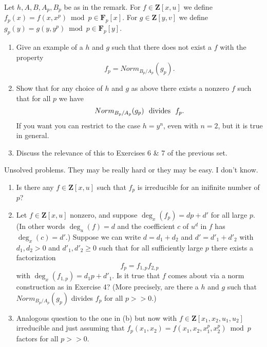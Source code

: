 \begin{exercise}
Let $h,A,B,A_p,B_p$ be as in the remark. For $f \in {\mathbf Z}[x,u]$ we
define $f_p(x) = f(x,x^p) \bmod p \in {\mathbf F}_p[x]$. For
$g \in {\mathbf Z}[y,v]$ we define
$g_p(y) = g(y,y^p) \bmod p \in {\mathbf F}_p[y]$. 
\begin{enumerate}
\item Give an example of a $h$ and $g$ such that 
there does not exist a $f$ with the property
$$
f_p  =  Norm_{B_p/A_p}(g_p).
$$
\item Show that for any choice of $h$ and $g$ as above
there exists a nonzero $f$ such that for all $p$ we have 
$$
Norm_{B_p/A_p}(g_p)\ \ \hbox{divides}\ \ f_p .
$$
If you want you can restrict to the case $h=y^n$, even with $n=2$,
but it is true in general.
\item Discuss the relevance of this to Exercises 6 \& 7 of the previous
set.
\end{enumerate}
\end{exercise}

\begin{exercise}
Unsolved problems. They may be really hard or they may be easy.
I don't know.
\begin{enumerate}
\item Is there any $f \in {\mathbf Z}[x,u]$ such that $f_p$ is
irreducible for an inifinite number of $p$?
\item Let $f \in {\mathbf Z}[x,u]$ nonzero, and suppose 
$\deg_x(f_p) = dp+d'$ for all large $p$. (In other words $\deg_u(f)=d$
and the coefficient $c$ of $u^d$ in $f$ has $\deg_x(c)=d'$.) Suppose we
can write $d = d_1 + d_2$ and $d' = d'_1 + d'_2$ with $d_1,d_2 > 0$
and $d'_1, d'_2 \geq 0$ such that for all sufficiently large $p$
there exists a factorization
$$
	f_p = f_{1,p} f_{2,p}
$$
with $\deg_x(f_{1,p}) = d_1p+d'_1$. Is it true that $f$ comes about via a
norm construction as in Exercise 4? (More precisely, are there a $h$ and
$g$ such that $Norm_{B_p/A_p}(g_p)$ divides $f_p$ for all $p >> 0$.)
\item Analogous question to the one in (b) but now with
$f \in {\mathbf Z}[x_1,x_2,u_1,u_2]$ irreducible and just assuming that
$f_p(x_1,x_2) = f(x_1,x_2,x_1^p,x_2^p) \bmod p$ factors for all
$p >> 0$.
\end{enumerate}
\end{exercise}


































